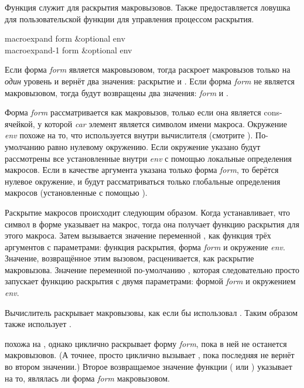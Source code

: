 Функция  служит для раскрытия макровызовов. Также
предоставляется ловушка для пользовательской функции для управления процессом
раскрытия.

\begin{defun}[Функция]
macroexpand form &optional env \\
macroexpand-1 form &optional env

Если форма \emph{form} является макровызовом, тогда  раскроет
макровызов только на \emph{один} уровень и вернёт два значения:
раскрытие и .
Если форма \emph{form} не является макровызовом, тогда будут возвращены два
значения: \emph{form} и {\nil}.

Форма \emph{form} рассматривается как макровызов, только если она является
cons-ячейкой, у которой \emph{car} элемент является символом имени макроса. 
Окружение \emph{env} похоже на то, что используется внутри вычислителя (смотрите
). По-умолчанию равно нулевому окружению.
Если окружение указано будут рассмотрены все установленные внутри \emph{env} с
помощью  локальные определения макросов. Если в качестве аргумента
указана только форма \emph{form}, то берётся нулевое окружение, и будут
рассматриваться только глобальные определения макросов (установленные с помощью
).

Раскрытие макросов происходит следующим образом. Когда 
устанавливает, что символ в форме указывает на макрос, тогда она получает
функцию раскрытия для этого макроса. Затем вызывается значение переменной
, как функция трёх аргументов с параметрами:
функция раскрытия,
форма \emph{form} и
окружение \emph{env}.
Значение, возвращённое этим вызовом, расценивается, как раскрытие макровызова.
Значение переменной  по-умолчанию , которая
следовательно просто запускает функцию раскрытия с двумя параметрами: формой
\emph{form} и окружением \emph{env}.

Вычислитель раскрывает макровызовы, как если бы использовал
. Таким образом  также использует
.

 похожа на , однако циклично раскрывает форму
\emph{form}, пока в ней не останется макровызовов.
(А точнее,  просто циклично вызывает , пока
последняя не вернёт {\nil} во втором значении.)
Второе возвращаемое значение функции  ( или {\nil})
указывает на то, являлась ли форма \emph{form} макровызовом.
\end{defun}

